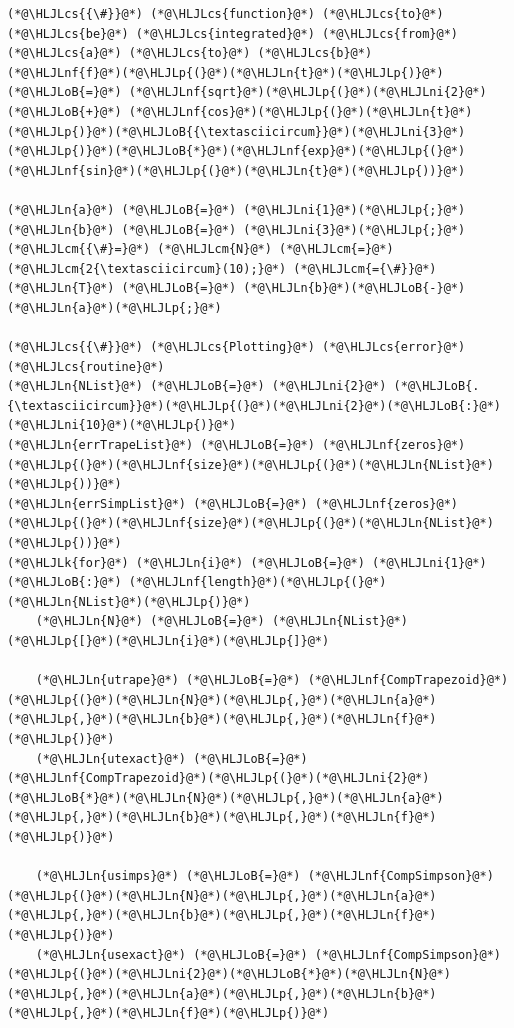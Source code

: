 \documentclass[12pt,a4paper]{article}
\newcommand{\HLJLk}[1]{\textcolor[RGB]{148,91,176}{\textbf{#1}}}
\newcommand{\HLJLn}[1]{#1}
\newcommand{\HLJLnf}[1]{\textcolor[RGB]{66,102,213}{#1}}
\newcommand{\HLJLni}[1]{\textcolor[RGB]{59,151,46}{#1}}
\newcommand{\HLJLoB}[1]{\textcolor[RGB]{102,102,102}{\textbf{#1}}}
\newcommand{\HLJLp}[1]{#1}
\newcommand{\HLJLcm}[1]{\textcolor[RGB]{153,153,119}{\textit{#1}}}
\newcommand{\HLJLcs}[1]{\textcolor[RGB]{153,153,119}{\textit{#1}}}
\begin{document}
\begin{lstlisting}
(*@\HLJLcs{{\#}}@*) (*@\HLJLcs{function}@*) (*@\HLJLcs{to}@*) (*@\HLJLcs{be}@*) (*@\HLJLcs{integrated}@*) (*@\HLJLcs{from}@*) (*@\HLJLcs{a}@*) (*@\HLJLcs{to}@*) (*@\HLJLcs{b}@*)
(*@\HLJLnf{f}@*)(*@\HLJLp{(}@*)(*@\HLJLn{t}@*)(*@\HLJLp{)}@*) (*@\HLJLoB{=}@*) (*@\HLJLnf{sqrt}@*)(*@\HLJLp{(}@*)(*@\HLJLni{2}@*) (*@\HLJLoB{+}@*) (*@\HLJLnf{cos}@*)(*@\HLJLp{(}@*)(*@\HLJLn{t}@*)(*@\HLJLp{)}@*)(*@\HLJLoB{{\textasciicircum}}@*)(*@\HLJLni{3}@*)(*@\HLJLp{)}@*)(*@\HLJLoB{*}@*)(*@\HLJLnf{exp}@*)(*@\HLJLp{(}@*)(*@\HLJLnf{sin}@*)(*@\HLJLp{(}@*)(*@\HLJLn{t}@*)(*@\HLJLp{))}@*)

(*@\HLJLn{a}@*) (*@\HLJLoB{=}@*) (*@\HLJLni{1}@*)(*@\HLJLp{;}@*) (*@\HLJLn{b}@*) (*@\HLJLoB{=}@*) (*@\HLJLni{3}@*)(*@\HLJLp{;}@*) (*@\HLJLcm{{\#}=}@*) (*@\HLJLcm{N}@*) (*@\HLJLcm{=}@*) (*@\HLJLcm{2{\textasciicircum}(10);}@*) (*@\HLJLcm{={\#}}@*) (*@\HLJLn{T}@*) (*@\HLJLoB{=}@*) (*@\HLJLn{b}@*)(*@\HLJLoB{-}@*)(*@\HLJLn{a}@*)(*@\HLJLp{;}@*)

(*@\HLJLcs{{\#}}@*) (*@\HLJLcs{Plotting}@*) (*@\HLJLcs{error}@*) (*@\HLJLcs{routine}@*)
(*@\HLJLn{NList}@*) (*@\HLJLoB{=}@*) (*@\HLJLni{2}@*) (*@\HLJLoB{.{\textasciicircum}}@*)(*@\HLJLp{(}@*)(*@\HLJLni{2}@*)(*@\HLJLoB{:}@*)(*@\HLJLni{10}@*)(*@\HLJLp{)}@*)
(*@\HLJLn{errTrapeList}@*) (*@\HLJLoB{=}@*) (*@\HLJLnf{zeros}@*)(*@\HLJLp{(}@*)(*@\HLJLnf{size}@*)(*@\HLJLp{(}@*)(*@\HLJLn{NList}@*)(*@\HLJLp{))}@*)
(*@\HLJLn{errSimpList}@*) (*@\HLJLoB{=}@*) (*@\HLJLnf{zeros}@*)(*@\HLJLp{(}@*)(*@\HLJLnf{size}@*)(*@\HLJLp{(}@*)(*@\HLJLn{NList}@*)(*@\HLJLp{))}@*)
(*@\HLJLk{for}@*) (*@\HLJLn{i}@*) (*@\HLJLoB{=}@*) (*@\HLJLni{1}@*) (*@\HLJLoB{:}@*) (*@\HLJLnf{length}@*)(*@\HLJLp{(}@*)(*@\HLJLn{NList}@*)(*@\HLJLp{)}@*)
    (*@\HLJLn{N}@*) (*@\HLJLoB{=}@*) (*@\HLJLn{NList}@*)(*@\HLJLp{[}@*)(*@\HLJLn{i}@*)(*@\HLJLp{]}@*)

    (*@\HLJLn{utrape}@*) (*@\HLJLoB{=}@*) (*@\HLJLnf{CompTrapezoid}@*)(*@\HLJLp{(}@*)(*@\HLJLn{N}@*)(*@\HLJLp{,}@*)(*@\HLJLn{a}@*)(*@\HLJLp{,}@*)(*@\HLJLn{b}@*)(*@\HLJLp{,}@*)(*@\HLJLn{f}@*)(*@\HLJLp{)}@*)
    (*@\HLJLn{utexact}@*) (*@\HLJLoB{=}@*) (*@\HLJLnf{CompTrapezoid}@*)(*@\HLJLp{(}@*)(*@\HLJLni{2}@*)(*@\HLJLoB{*}@*)(*@\HLJLn{N}@*)(*@\HLJLp{,}@*)(*@\HLJLn{a}@*)(*@\HLJLp{,}@*)(*@\HLJLn{b}@*)(*@\HLJLp{,}@*)(*@\HLJLn{f}@*)(*@\HLJLp{)}@*)

    (*@\HLJLn{usimps}@*) (*@\HLJLoB{=}@*) (*@\HLJLnf{CompSimpson}@*)(*@\HLJLp{(}@*)(*@\HLJLn{N}@*)(*@\HLJLp{,}@*)(*@\HLJLn{a}@*)(*@\HLJLp{,}@*)(*@\HLJLn{b}@*)(*@\HLJLp{,}@*)(*@\HLJLn{f}@*)(*@\HLJLp{)}@*)
    (*@\HLJLn{usexact}@*) (*@\HLJLoB{=}@*) (*@\HLJLnf{CompSimpson}@*)(*@\HLJLp{(}@*)(*@\HLJLni{2}@*)(*@\HLJLoB{*}@*)(*@\HLJLn{N}@*)(*@\HLJLp{,}@*)(*@\HLJLn{a}@*)(*@\HLJLp{,}@*)(*@\HLJLn{b}@*)(*@\HLJLp{,}@*)(*@\HLJLn{f}@*)(*@\HLJLp{)}@*)


\end{lstlisting}
\end{document}
